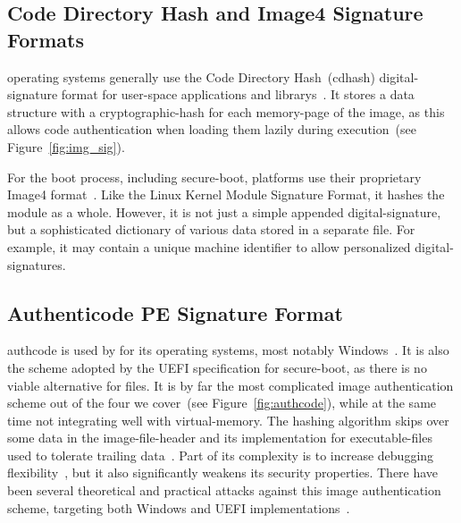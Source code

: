 \subsection{Code Directory Hash and Image4 Signature Formats}
\label{sec:cdhash}

 operating systems generally use the Code Directory Hash~(cdhash) \gls{digital-signature} format for \gls{user-space} applications and \glspl{library}~\cite{apple-cdhash,apple-cdhash-old}. It stores a data structure with a \gls{cryptographic-hash} for each \gls{memory-page} of the  \gls{image}, as this allows code authentication when loading them lazily during execution~(see Figure~\ref{fig:img_sig}).

For the boot process, including \gls{secure-boot},  platforms use their proprietary Image4 format~\cite{xnu,opencore}. Like the Linux Kernel Module Signature Format, it hashes the module as a whole. However, it is not just a simple appended \gls{digital-signature}, but a sophisticated dictionary of various data stored in a separate file. For example, it may contain a unique machine identifier to allow personalized \glspl{digital-signature}.

\subsection{Authenticode PE Signature Format}
\label{sec:authenticode}

\Gls{authcode} is used by  for its operating systems, most notably Windows~\cite{pe-authenticode}. It is also the scheme adopted by the \gls{UEFI} specification for \gls{secure-boot}, as there is no viable alternative for  files. It is by far the most complicated \gls{image} authentication scheme out of the four we cover~(see Figure~\ref{fig:authcode}), while at the same time not integrating well with \gls{virtual-memory}. The hashing algorithm skips over some data in the \gls{image-file-header} and its implementation for \glspl{executable-file} used to tolerate trailing data~\cite{jar-msi-auth-bug}. Part of its complexity is to increase debugging flexibility~\cite{pe-authenticode}, but it also significantly weakens its security properties. There have been several theoretical and practical attacks against this \gls{image} authentication scheme, targeting both Windows and \gls{UEFI} implementations~\cite{secure-pe,jar-msi-auth-bug,mic-auth-bug,win-auth-bug,uefi-auth-bug}.


